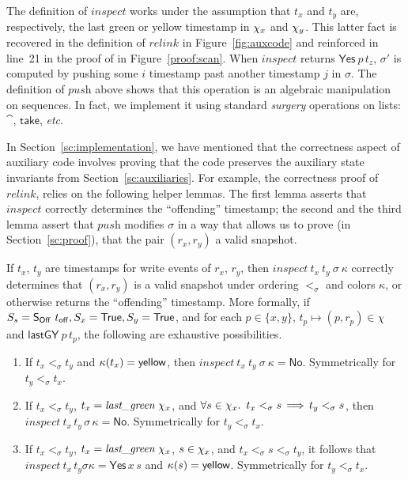 \documentclass[a4paper,UKenglish]{lipics-v2016}
\newcommand{\etc}{\emph{etc}}
\newcommand{\aux}[1]{\textit{#1}}
\newcommand{\hist}{\chi}
\newcommand{\hpts}{\mapsto}
\newcommand{\ldot}{\mathord{.}\,}
\def\TT{\mathsf{True}}
\def\ordlist{\sigma}
\newcommand{\C}{\kappa}
\newcommand{\tle}{\mathrel{<_\ordlist}}
\def\ordlistP{\sigma'}
\def\lgVy{\ensuremath{\mathsf{lastGY}}}
\newcommand{\sOff}{\mathsf{S_{Off}}}
\theoremstyle{definition}
\begin{document}
The definition of $\aux{inspect}$ works under the assumption that
$t_x$ and $t_y$ are, respectively, the last green or yellow timestamp
in $\histx$ and $\histy$. This latter fact is recovered in the
definition of $\aux{relink}$ in Figure~\ref{fig:auxcode} and
reinforced in line~21 in the proof of {\jyscan} in
Figure~\ref{proof:scan}. When $\aux{inspect}$ returns
$\mathsf{Yes}\ p\, t_z$, $\ordlistP$ is computed by pushing some $i$
timestamp past another timestamp $j$ in $\ordlist$. The definition of
$\aux{push}$ above shows that this operation is an algebraic
manipulation on sequences. In fact, we implement it using standard
{\it surgery} operations on lists: $\cat$, $\mathsf{take}$, \etc.

In Section~\ref{sc:implementation}, we have mentioned that the
correctness aspect of auxiliary code involves proving that the code
preserves the auxiliary state invariants from
Section~\ref{sc:auxiliaries}. For example, the correctness proof of
$\aux{relink}$, relies on the following helper lemmas. The first lemma
asserts that $\aux{inspect}$ correctly determines the ``offending''
timestamp; the second and the third lemma assert that $\aux{push}$
modifies $\ordlist$ in a way that allows us to prove (in
Section~\ref{sc:proof}), that the pair $(r_x, r_y)$ a valid snapshot.

\begin{lemma}[Correctness of $\aux{inspect}$]\label{lem:inspect}
If $t_x$, $t_y$ are timestamps for write events of $r_x$, $r_y$, then
$\aux{inspect}\ t_x\ t_y\ \ordlist\ \C$ correctly determines that
$(r_x, r_y)$ is a valid snapshot under ordering $\tle$ and colors
$\C$, or otherwise returns the ``offending'' timestamp. More formally,
if $\sss = \sOff\ \toff, \sx =\TT, \sy =\TT$, and for each $p \in
\{x,y\}$, $ t_p \hpts (p, r_p) \in \hist$ and $\lgVy\ p\, t_p $, the
following are exhaustive possibilities.

\begin{enumerate}
 \item If $t_x \tle t_y$ and $ \C(t_x) = {\sf yellow}$, then
   $\aux{inspect}\ t_x\ t_y\ \ordlist\ \C =
   \mathsf{No}$. Symmetrically for $t_y \tle t_x$.

 \item If $ t_x \tle t_y $, $ t_x = \aux{last\_green}\ \histx$, and
       $\forall s \in \histx\ldot\ t_x \tle s\,{\implies}\,t_y \tle
       s$, then \\ $\aux{inspect}\ t_x\, t_y\, \ordlist\, \C
       = \mathsf{No}$. Symmetrically for $t_y \tle t_x$.

 \item If $ t_x <_{\ordlist} t_y $, $ t_x = \aux{last\_green}\ \histx
   $, $s \in \histx$, and $t_x \tle s \tle t_y$, it follows that
   $\aux{inspect}\ t_x\, t_y \ordlist \C = \mathsf{Yes}\, x\, s$ and
   $\C(s) = {\sf yellow}$. Symmetrically for $t_y \tle t_x$.
\end{enumerate}
\end{lemma}
\end{document}
